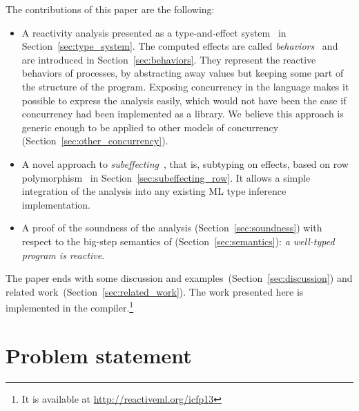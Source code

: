\documentclass[9pt]{sigplanconf}
\begin{document}

The contributions of this paper are the following:
\begin{itemize}
\item A reactivity analysis presented as a type-and-effect system~\cite{Lucassen:1988} in Section~\ref{sec:type_system}. The computed effects are called \emph{behaviors}~\cite{Amtoft:1999} and are introduced in Section~\ref{sec:behaviors}. They represent the reactive behaviors of processes, by abstracting away values but keeping some part of the structure of the program. Exposing concurrency in the language makes it possible to express the analysis easily, which would not have been the case if concurrency had been implemented as a library. We believe this approach is generic enough to be applied to other models of concurrency (Section~\ref{sec:other_concurrency}).
\item A novel approach to \emph{subeffecting}~\cite{Nielson:1999}, that is, subtyping on effects, based on row polymorphism~\cite{Remy:1993} in Section~\ref{sec:subeffecting_row}. It allows a simple integration of the analysis into any existing ML type inference implementation.
\item A proof of the soundness of the analysis (Section~\ref{sec:soundness}) with respect to the big-step semantics of \rml (Section~\ref{sec:semantics}): \emph{a well-typed program is reactive}.
\end{itemize}

The paper ends with some discussion and examples~(Section~\ref{sec:discussion}) and related work~(Section~\ref{sec:related_work}). The work presented here is implemented in the \rml compiler.\footnote{It is available at \url{http://reactiveml.org/icfp13}}

\clearpage

\section{Problem statement}
\label{sec:problem}
\end{document}
